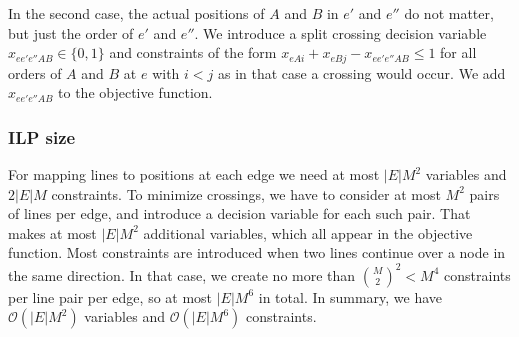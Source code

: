 \documentclass[format=acmsmall, review=false, screen=true]{acmart}
\begin{document}
In the second case, the actual positions of $A$ and $B$ in $e'$ and $e''$ do not matter, but just the order of $e'$ and $e''$. We introduce a split crossing decision variable $x_{ee'e''AB} \in \{0,1\}$ and constraints of the form $x_{eAi} + x_{eBj} - x_{ee'e''AB} \leq 1$ for all orders of $A$ and $B$ at $e$ with $i < j$ as in that case a crossing would occur.
We add $x_{ee'e''AB}$ to the objective function.

\subsubsection{ILP size}
For mapping lines to positions at each edge we need at most $|E|M^{2}$ variables and $2|E|M$ constraints. To minimize crossings, we have to consider at most $M^{2}$ pairs of lines per edge, and introduce a decision variable for each such pair. That makes at most $|E| M^{2}$ additional variables, which all appear in the objective function. Most constraints are introduced when two lines continue over a node in the same direction. In that case, we create no more than $\binom{M}{2}^{2} < M^{4}$ constraints per line pair per edge, so at most $|E| M^{6}$ in total.
In summary, we have $\mathcal{O}(|E|M^{2})$ variables and $\mathcal{O}(|E|M^{6})$ constraints.
\end{document}
